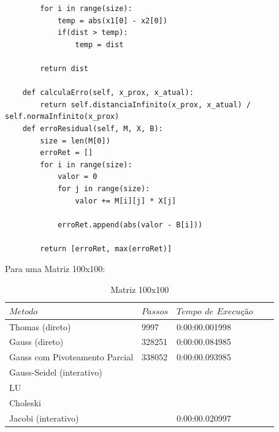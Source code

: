 \documentclass{article}
\begin{document}
\begin{itemize}
\begin{lstlisting}
        for i in range(size):
            temp = abs(x1[0] - x2[0])
            if(dist > temp):
                temp = dist
                
        return dist
            
    def calculaErro(self, x_prox, x_atual):
        return self.distanciaInfinito(x_prox, x_atual) / self.normaInfinito(x_prox)
    def erroResidual(self, M, X, B):
        size = len(M[0])
        erroRet = []
        for i in range(size):
            valor = 0
            for j in range(size):
                valor += M[i][j] * X[j]

            erroRet.append(abs(valor - B[i]))

        return [erroRet, max(erroRet)]
\end{lstlisting}

\newpage

\text Para uma Matriz 100x100:

\begin{table}[h]
\centering
  \begin{tabular}{l||l|lll}
    $Metodo$ & $Passos$ & $Tempo$ $de$ $Execução$ \\
    \hline
    Thomas (direto) & 9997 & 0:00:00.001998 \\
    
    Gauss (direto) & 328251 & 0:00:00.084985 \\
    
    Gauss com Pivoteamento Parcial & 338052 & 0:00:00.093985 \\
    
    Gauss-Seidel (interativo) &  &  \\
    
    LU &  \\
    
    Choleski & \\
    
    Jacobi (interativo) & & 0:00:00.020997 \\
    \hline
  \end{tabular}
  \caption{Matriz 100x100}
\end{table}



\end{itemize}
\end{document}
